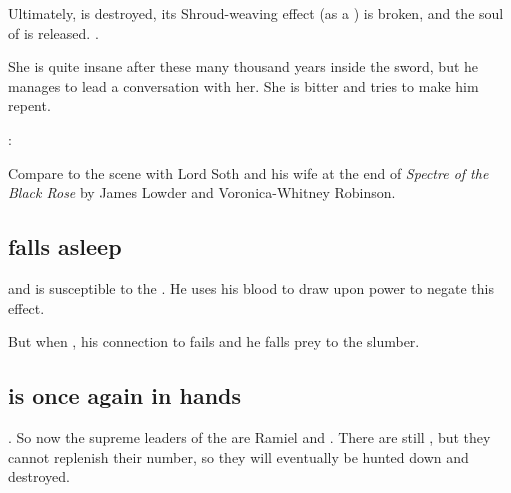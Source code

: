 Ultimately,  is destroyed, its Shroud-weaving effect (as a ) is broken, and the soul of \Triestessakhin{} is released. 
. 

She is quite insane after these many thousand years inside the sword, but he manages to lead a conversation with her. She is bitter and tries to make him repent. 

\Ishnaruchaefir: 

Compare to the scene with Lord Soth and his wife at the end of \emph{Spectre of the Black Rose} by James Lowder and Voronica-Whitney Robinson. 



% 







\subsection{\Vizsherioch falls asleep}
\Vizsherioch{}  and is susceptible to the . He uses his \bane{} blood to draw upon \Erebean{} power to negate this effect. 

But when , his connection to \Erebos{} fails and he falls prey to the \xsic{} slumber. 







\subsection{\Miith is once again in \Miithian hands}
. So now the supreme leaders of the \resphain{} are Ramiel and . There are still \banelords, but they cannot replenish their number, so they will eventually be hunted down and destroyed. 

